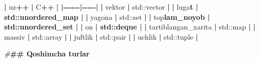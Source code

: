 \documentclass[a4paper,11pt,twoside,openright]{book}
\newenvironment{Shaded}{\begin{snugshade}}{\end{snugshade}}
\newcommand{\BuiltInTok}[1]{#1}
\newcommand{\CharTok}[1]{\textcolor[rgb]{0.31,0.60,0.02}{#1}}
\newcommand{\ErrorTok}[1]{\textcolor[rgb]{0.64,0.00,0.00}{\textbf{#1}}}
\newcommand{\NormalTok}[1]{#1}
\newcommand{\OperatorTok}[1]{\textcolor[rgb]{0.81,0.36,0.00}{\textbf{#1}}}
\newcommand{\PreprocessorTok}[1]{\textcolor[rgb]{0.56,0.35,0.01}{\textit{#1}}}
\begin{document}
\begin{Shaded}
\begin{Highlighting}[]
\OperatorTok{|}\NormalTok{ uz}\OperatorTok{++} \OperatorTok{|}\NormalTok{ C}\OperatorTok{++} \OperatorTok{|}
\OperatorTok{|{-}{-}{-}{-}{-}{-}|{-}{-}{-}{-}{-}|}
\OperatorTok{|} \ErrorTok{\textasciigrave{}}\NormalTok{vektor}\ErrorTok{\textasciigrave{}} \OperatorTok{|} \ErrorTok{\textasciigrave{}}\BuiltInTok{std::}\NormalTok{vector}\ErrorTok{\textasciigrave{}} \OperatorTok{|}
\OperatorTok{|} \ErrorTok{\textasciigrave{}}\NormalTok{lug}\CharTok{\textquotesingle{}a}\ErrorTok{t\textasciigrave{} | \textasciigrave{}std::unordered\_map\textasciigrave{} |}
\OperatorTok{|} \ErrorTok{\textasciigrave{}}\NormalTok{yagona}\ErrorTok{\textasciigrave{}} \OperatorTok{|} \ErrorTok{\textasciigrave{}}\BuiltInTok{std::}\NormalTok{set}\ErrorTok{\textasciigrave{}} \OperatorTok{|}
\OperatorTok{|} \ErrorTok{\textasciigrave{}}\NormalTok{to}\CharTok{\textquotesingle{}p}\ErrorTok{lam\_noyob\textasciigrave{} | \textasciigrave{}std::unordered\_set\textasciigrave{} |}
\OperatorTok{|} \ErrorTok{\textasciigrave{}}\NormalTok{o}\CharTok{\textquotesingle{}n}\ErrorTok{\textasciigrave{} | \textasciigrave{}std::deque\textasciigrave{} |}
\OperatorTok{|} \ErrorTok{\textasciigrave{}}\NormalTok{tartiblangan\_xarita}\ErrorTok{\textasciigrave{}} \OperatorTok{|} \ErrorTok{\textasciigrave{}}\BuiltInTok{std::}\NormalTok{map}\ErrorTok{\textasciigrave{}} \OperatorTok{|}
\OperatorTok{|} \ErrorTok{\textasciigrave{}}\NormalTok{massiv}\ErrorTok{\textasciigrave{}} \OperatorTok{|} \ErrorTok{\textasciigrave{}}\BuiltInTok{std::}\NormalTok{array}\ErrorTok{\textasciigrave{}} \OperatorTok{|}
\OperatorTok{|} \ErrorTok{\textasciigrave{}}\NormalTok{juftlik}\ErrorTok{\textasciigrave{}} \OperatorTok{|} \ErrorTok{\textasciigrave{}}\BuiltInTok{std::}\NormalTok{pair}\ErrorTok{\textasciigrave{}} \OperatorTok{|}
\OperatorTok{|} \ErrorTok{\textasciigrave{}}\NormalTok{uchlik}\ErrorTok{\textasciigrave{}} \OperatorTok{|} \ErrorTok{\textasciigrave{}}\BuiltInTok{std::}\NormalTok{tuple}\ErrorTok{\textasciigrave{}} \OperatorTok{|}

\PreprocessorTok{\#}\ErrorTok{\#\# Qo\textquotesingle{}shimcha turlar}


\end{Highlighting}
\end{Shaded}
\end{document}
